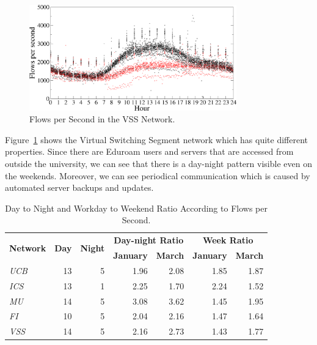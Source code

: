 \begin{figure}[!t]
        \begin{center}
                \includegraphics[width=0.8\textwidth]{figures/paper-characterization/flows-vss-jan}
                \caption{Flows per Second in the VSS Network.} \label{fig:characterization-flows-vss-jan}
        \end{center}
\end{figure}

Figure~\ref{fig:characterization-flows-vss-jan} shows the Virtual Switching Segment network which has quite different properties. Since there are Eduroam users and servers that are accessed from outside the university, we can see that there is a day-night pattern visible even on the weekends. Moreover, we can see periodical communication which is caused by automated server backups and updates.

\begin{table}[!htb]
        \centering
        \renewcommand{\arraystretch}{1.1}
        \begin{tabular}{|l|r|r|r|r|r|r|} \hline
                \multirow{2}{*}{\centering\textbf{Network}}  & \multirow{2}{*}{\centering\textbf{Day}} & \multirow{2}{*}{\centering\textbf{Night}} & \multicolumn{2}{c|}{\textbf{Day-night Ratio}}  & \multicolumn{2}{c|}{\textbf{Week Ratio}}  \\ \cline{4-7}
                & & & \textbf{January} & \textbf{March} & \textbf{January} & \textbf{March} \\ \hline
                \textit{UCB} & 13 & 5 &  1.96 & 2.08 & 1.85  & 1.87 \\ \hline
                \textit{ICS} & 13 & 1 & 2.25  & 1.70 & 2.24 & 1.52 \\ \hline
                \textit{MU} & 14 & 5 & 3.08 & 3.62 & 1.45 & 1.95 \\ \hline
                \textit{FI} & 10 & 5 & 2.04 & 2.16 & 1.47 & 1.64 \\ \hline
                \textit{VSS} & 14 & 5 & 2.16 & 2.73 & 1.43 & 1.77 \\ \hline
        \end{tabular}
        \caption{Day to Night and Workday to Weekend Ratio According to Flows per Second.}
        \label{tab:characterization-day-night-ratio}
\end{table}

